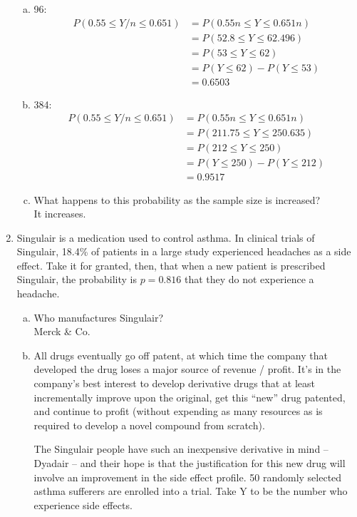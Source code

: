 \documentclass{scrartcl}
\begin{document}
\begin{enumerate}
\begin{enumerate}[a)]
\item 96:\\
\begin{align*}
  P(0.55\le Y/n\le0.651) &= P(0.55n\le Y \le0.651n)\\
  &= P(52.8\le Y\le 62.496)\\
  &= P(53\le Y \le62)\\
  &= P(Y\le62) - P(Y\le53)\\
  &= 0.6503
\end{align*}


\item 384:\\
\begin{align*}
  P(0.55\le Y/n\le0.651) &= P(0.55n\le Y \le0.651n)\\
  &= P(211.75\le Y\le 250.635)\\
  &= P(212\le Y \le250)\\
  &= P(Y\le250) - P(Y\le212)\\
  &= 0.9517
\end{align*}


\item What happens to this probability as the sample size is increased?\\

  It increases.

\end{enumerate}\pagebreak

\item Singulair is a medication used to control asthma. In clinical trials of Singulair, 18.4\% of patients in a large study experienced headaches as a side effect. Take it for granted, then, that when a new patient is prescribed Singulair, the probability is $p = 0.816$ that they do not experience a headache.

\begin{enumerate}[a)]
\item Who manufactures Singulair?\\
Merck \& Co.

\item All drugs eventually go off patent, at which time the company that developed the drug loses a major source of revenue / profit. It’s in the company’s best interest to develop derivative drugs that at least incrementally improve upon the original, get this “new” drug patented, and continue to profit (without expending as many resources as is required to develop a novel compound from scratch).

The Singulair people have such an inexpensive derivative in mind – Dyadair – and their hope is that the justification for this new drug will involve an improvement in the side effect profile. 50 randomly selected asthma sufferers are enrolled into a trial. Take Y to be the number who experience side effects.


\end{enumerate}
\end{enumerate}
\end{document}
